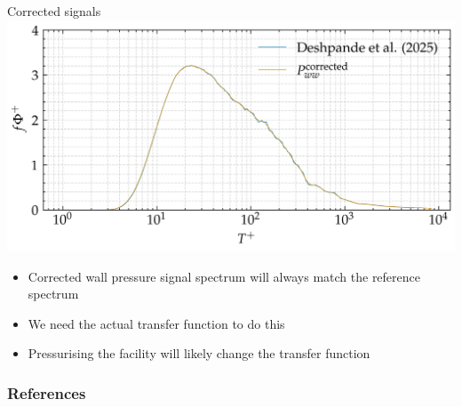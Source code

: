 \documentclass[aspectratio=169]{beamer}
\begin{document}
\begin{frame}{Corrected signals}
    \centering
    \includegraphics[width=0.7\linewidth]{figures/final_spectrum.png}
    \begin{itemize}
        \centering
        \item Corrected wall pressure signal spectrum will always match the reference spectrum
        \item We need the actual transfer function to do this
        \item Pressurising the facility will likely change the transfer function
    \end{itemize}
\end{frame}

\begin{frame}
    \frametitle{References}
    
    
\end{frame}
\end{document}
